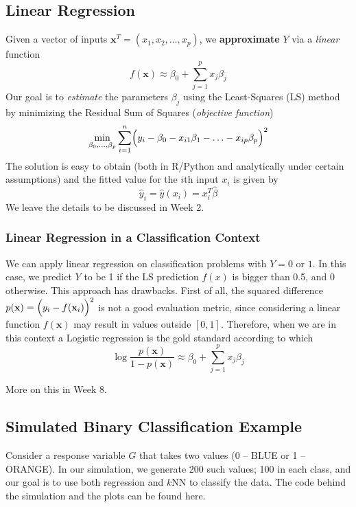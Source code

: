 \documentclass[
]{book}
\begin{document}
\subsection{Linear Regression}\label{linear-regression}

Given a vector of inputs \(\mathbf{x}^T = (x_1, x_2, \ldots, x_p)\), we \textbf{approximate} \(Y\) via a \emph{linear} function
\[f(\mathbf{x}) \approx \beta_0 + \sum_{j=1}^{p} x_j \beta_j\]
Our goal is to \emph{estimate} the parameters \(\beta_j\) using the Least-Squares (LS) method by minimizing the Residual Sum of Squares (\emph{objective function})
\[\min_{\beta_0, \ldots, \beta_p} \sum_{i=1}^{n} \Bigl( y_i - \beta_0 - x_{i1}\beta_1 - \ldots - x_{ip} \beta_p \Bigr)^2\]
The solution is easy to obtain (both in R/Python and analytically under certain assumptions) and the fitted value for the \(i\)th input \(x_i\) is given by
\[\hat{y}_i = \hat{y}(x_i) = x_i^T \hat{\beta}\]
We leave the details to be discussed in Week 2.

\subsubsection*{Linear Regression in a Classification Context}\label{linear-regression-in-a-classification-context}

We can apply linear regression on classification problems with \(Y=0 \text{ or } 1\). In this case, we predict \(Y\) to be 1 if the LS prediction \(f(x)\) is bigger than 0.5, and 0 otherwise. This approach has drawbacks. First of all, the squared difference \(p(\mathbf{x}) = \Bigl(y_i - f(\mathbf{x}_i) \Bigr)^2\) is not a good evaluation metric, since considering a linear function \(f(\mathbf{x})\) may result in values outside \([0,1]\). Therefore, when we are in this context a Logistic regression is the gold standard according to which
\[\log \frac{p(\mathbf{x})}{1-p(\mathbf{x}) } \approx \beta_0 + \sum_{j=1}^{p} x_j \beta_j\]

More on this in Week 8.

\subsection{Simulated Binary Classification Example}\label{simulated-binary-classification-example}

Consider a response variable \(G\) that takes two values (0 -- BLUE or 1 -- ORANGE). In our simulation, we generate 200 such values; 100 in each class, and our goal is to use both regression and \(k\)NN to classify the data. The code behind the simulation and the plots can be found here.
\end{document}
